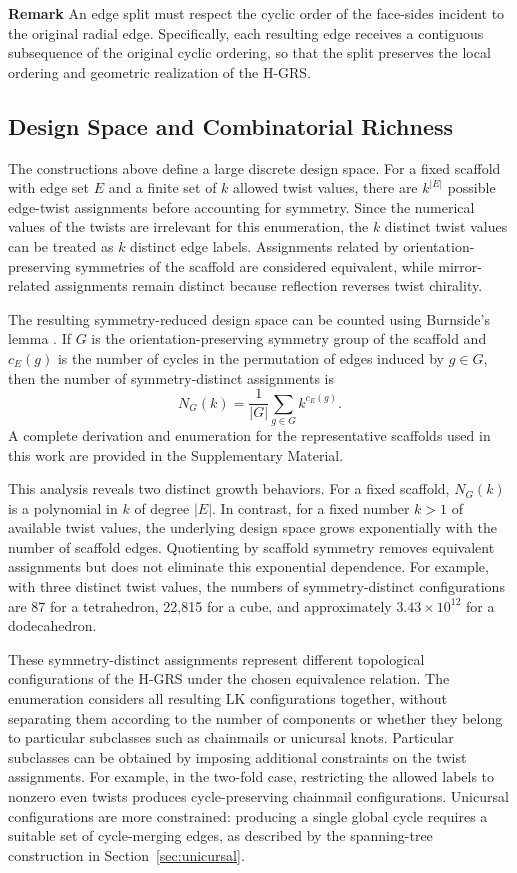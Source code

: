 \documentclass[acmtog]{acmart}
\begin{document}
\noindent \textbf{Remark} An edge split must respect the cyclic order of the face-sides incident to the original radial edge. Specifically, each resulting edge receives a contiguous subsequence of the original cyclic ordering, so that the split preserves the local ordering and geometric realization of the H-GRS. 

\subsection{Design Space and Combinatorial Richness}

The constructions above define a large discrete design space. For a
fixed scaffold with edge set $E$ and a finite set of $k$ allowed twist
values, there are $k^{|E|}$ possible edge-twist assignments before
accounting for symmetry. Since the numerical values of the twists are
irrelevant for this enumeration, the $k$ distinct twist values can be
treated as $k$ distinct edge labels. Assignments related by
orientation-preserving symmetries of the scaffold are considered
equivalent, while mirror-related assignments remain distinct because
reflection reverses twist chirality.

The resulting symmetry-reduced design space can be counted using
Burnside's lemma \cite{burnside1911theory}. If $G$ is the orientation-preserving symmetry group
of the scaffold and $c_E(g)$ is the number of cycles in the permutation
of edges induced by $g\in G$, then the number of symmetry-distinct
assignments is
\begin{equation}
N_G(k)=\frac{1}{|G|}\sum_{g\in G} k^{c_E(g)}.
\end{equation}
A complete derivation and enumeration for the representative
scaffolds used in this work are provided in the Supplementary
Material.

This analysis reveals two distinct growth behaviors. For a fixed
scaffold, $N_G(k)$ is a polynomial in $k$ of degree $|E|$. In contrast,
for a fixed number $k>1$ of available twist values, the underlying
design space grows exponentially with the number of scaffold edges.
Quotienting by scaffold symmetry removes equivalent assignments but
does not eliminate this exponential dependence. For example, with
three distinct twist values, the numbers of symmetry-distinct
configurations are 87 for a tetrahedron, 22,815 for a cube, and
approximately $3.43\times10^{12}$ for a dodecahedron.

These symmetry-distinct assignments represent different topological
configurations of the H-GRS under the chosen equivalence relation.
The enumeration considers all resulting LK configurations together,
without separating them according to the number of components or
whether they belong to particular subclasses such as chainmails or
unicursal knots. Particular subclasses can be obtained by imposing
additional constraints on the twist assignments. For example, in the
two-fold case, restricting the allowed labels to nonzero even twists
produces cycle-preserving chainmail configurations. Unicursal
configurations are more constrained: producing a single global cycle
requires a suitable set of cycle-merging edges, as described by the
spanning-tree construction in Section~\ref{sec:unicursal}.
\end{document}
